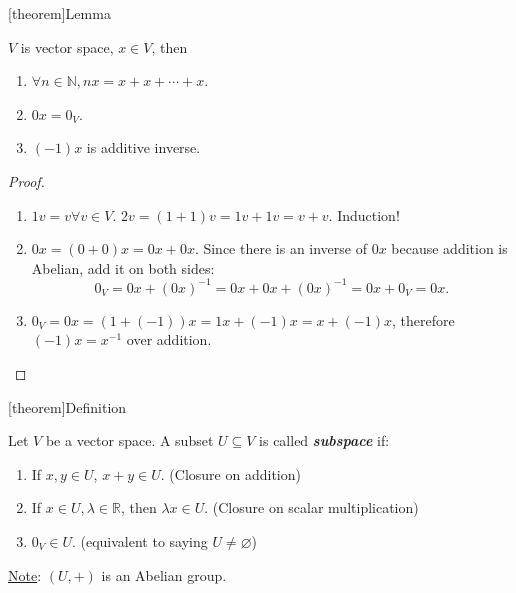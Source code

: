 \documentclass[12pt]{report}
\theoremstyle{definition}
\begin{document}
[theorem]{Lemma}
\begin{vector space property}
    $V$ is vector space, $x \in V$, then
    \begin{enumerate}[label = (\arabic*)]
        \item $\forall n \in \mathbb{N}, nx = x + x + \cdots + x$.
        \item $0 x = 0_V$.
        \item $(-1)x$ is additive inverse.
    \end{enumerate}
\end{vector space property}

\begin{proof}
    \,

    \begin{enumerate}[label = (\arabic*)]
        \item $1v = v \forall v \in V$.
            $2v = (1 + 1)v = 1v + 1v = v + v$.
            Induction!

        \item $0x = (0 + 0)x = 0x + 0x$.
            Since there is an inverse of $0x$ because addition is Abelian,
            add it on both sides:\[
                0_V = 0x + {(0x)}^{-1} = 0x + 0x + {(0x)}^{-1} = 0x + 0_V = 0x.
            \]

        \item $0_V = 0x = (1 + (-1))x = 1x + (-1)x = x + (-1)x$, therefore
            $(-1)x = x^{-1}$ over addition.
    \end{enumerate}
\end{proof}

[theorem]{Definition}
\begin{subspace}
    Let $V$ be a vector space. A subset $U \subseteq V$ is called \textbf{\emph{subspace}} if:
    \begin{enumerate}[label = (\arabic*)]
        \item If $x, y \in U$, $x + y \in U$. (Closure on addition)
        \item If $x \in U, \lambda \in \mathbb{R}$, then $\lambda x \in U$. (Closure on scalar multiplication)
        \item $0_V \in U$. (equivalent to saying $U \neq \varnothing$)
    \end{enumerate}
\end{subspace}

\underline{Note}: $(U, +)$ is an Abelian group.
\end{document}
